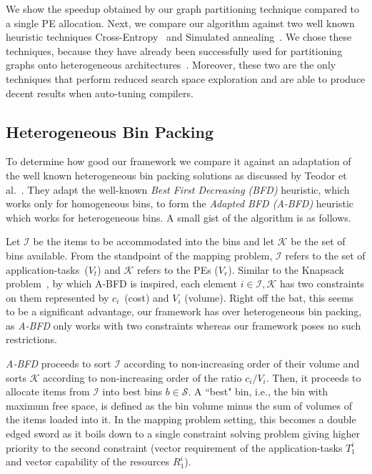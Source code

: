 \documentclass[10pt, conference, compsocconf]{IEEEtran}
\begin{document}
We show the speedup obtained by our graph partitioning technique
compared to a single PE allocation. Next, we compare our algorithm
against two well known heuristic techniques Cross-Entropy~\cite{ssan05}
and Simulated annealing~\cite{horsi06}. We chose these techniques,
because they have already been successfully used for partitioning graphs
onto heterogeneous architectures~\cite{ssan05}. Moreover, these two are
the only techniques that perform reduced search space exploration and
are able to produce decent results when auto-tuning compilers.

\subsection{Heterogeneous Bin Packing}

To determine how good our framework we compare it against an adaptation
of the well known heterogeneous bin packing solutions as discussed by
Teodor et al.~\cite{tcra11}. They adapt the well-known \textit{Best
  First Decreasing (BFD)} heuristic, which works only for homogeneous
bins, to form the \textit{Adapted BFD (A-BFD)} heuristic which works for
heterogeneous bins. A small gist of the algorithm is as follows.

Let $\mathcal{I}$ be the items to be accommodated into the bins and let
$\mathcal{K}$ be the set of bins available.  From the standpoint of the
mapping problem, $\mathcal{I}$ refers to the set of
\mbox{application-tasks ($V_t$)} and $\mathcal{K}$ refers to the PEs
($V_r$). Similar to the Knapsack problem~\cite{sski08}, by which A-BFD
is inspired, each element $i \in \mathcal{I}, \mathcal{K}$ has two
constraints on them represented by \mbox{$c_i$ (cost)} and $V_i$
(volume). Right off the bat, this seems to be a significant advantage,
our framework has over heterogeneous bin packing, as \textit{A-BFD} only
works with two constraints whereas our framework poses no such
restrictions.

\textit{A-BFD} proceeds to sort $\mathcal{I}$ according to
non-increasing order of their volume and sorts $\mathcal{K}$ according
to non-increasing order of the ratio $c_i/V_i$. Then, it proceeds to
allocate items from $\mathcal{I}$ into best bins $b \in \mathcal{S}$. A
``best" bin, i.e., the bin with maximum free space, is defined as the
bin volume minus the sum of volumes of the items loaded into it. In the
mapping problem setting, this becomes a double edged sword as it boils
down to a single constraint solving problem giving higher priority to
the second constraint (vector requirement of the application-tasks
$T^i_1$ and vector capability of the resources $R^i_1$).
\end{document}
